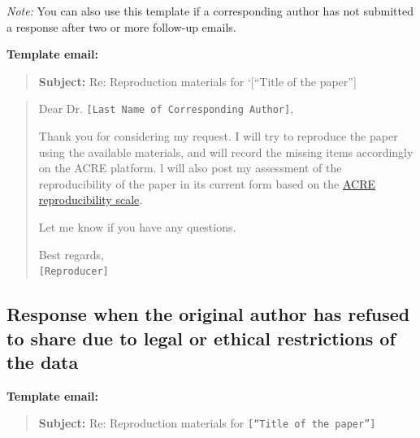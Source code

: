 \documentclass[]{book}
\begin{document}
\emph{Note:} You can also use this template if a corresponding author has not submitted a response after two or more follow-up emails.

\textbf{Template email:}

\begin{quote}
\textbf{Subject:} Re: Reproduction materials for `{[}``Title of the paper''{]}
\end{quote}

\begin{quote}
Dear Dr. \texttt{{[}Last\ Name\ of\ Corresponding\ Author{]}},

Thank you for considering my request. I will try to reproduce the paper using the available materials, and will record the missing items accordingly on the ACRE platform. l will also post my assessment of the reproducibility of the paper in its current form based on the \href{https://bitss.github.io/ACRE/assessment.html\#levels-of-computational-reproducibility-for-a-specific-output}{ACRE reproducibility scale}.

Let me know if you have any questions.

Best regards,\\
\texttt{{[}Reproducer{]}}
\end{quote}

\hypertarget{response-when-the-original-author-has-refused-to-share-due-to-legal-or-ethical-restrictions-of-the-data}{%
\subsection{Response when the original author has refused to share due to legal or ethical restrictions of the data}\label{response-when-the-original-author-has-refused-to-share-due-to-legal-or-ethical-restrictions-of-the-data}}

\textbf{Template email:}

\begin{quote}
\textbf{Subject:} Re: Reproduction materials for \texttt{{[}“Title\ of\ the\ paper”{]}}
\end{quote}
\end{document}
